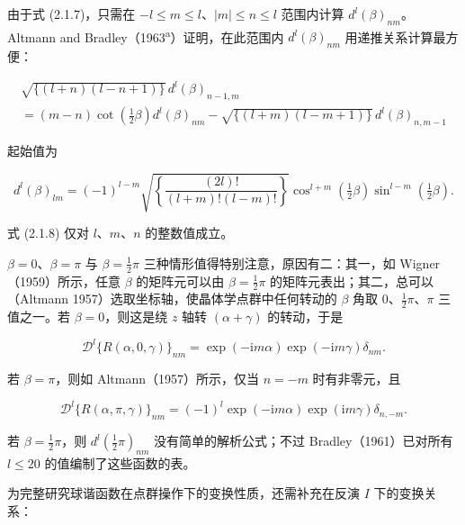 由于式 (2.1.7)，只需在 $-l \leqslant m \leqslant l$、$|m| \leqslant n \leqslant l$ 范围内计算 $d^{l}(\beta)_{nm}$。Altmann and Bradley（1963\textsuperscript{a}）证明，在此范围内 $d^{l}(\beta)_{nm}$ 用递推关系计算最方便：

\begin{equation*}
\begin{aligned}
\sqrt{\{(l+n)(l-n+1)\}}\, d^{l}(\beta)_{n-1,m} \\
= (m-n)\cot\left(\tfrac{1}{2}\beta\right)d^{l}(\beta)_{nm} - \sqrt{\{(l+m)(l-m+1)\}}\, d^{l}(\beta)_{n,m-1}
\end{aligned}
\tag{2.1.8}
\end{equation*}

起始值为

\begin{equation*}
d^{l}(\beta)_{lm} = (-1)^{l-m}\sqrt{\left\{\frac{(2l)!}{(l+m)!(l-m)!}\right\}}\cos^{l+m}\left(\tfrac{1}{2}\beta\right)\sin^{l-m}\left(\tfrac{1}{2}\beta\right).
\tag{2.1.9}
\end{equation*}

式 (2.1.8) 仅对 $l$、$m$、$n$ 的整数值成立。

$\beta = 0$、$\beta = \pi$ 与 $\beta = \tfrac{1}{2}\pi$ 三种情形值得特别注意，原因有二：其一，如 Wigner（1959）所示，任意 $\beta$ 的矩阵元可以由 $\beta = \tfrac{1}{2}\pi$ 的矩阵元表出；其二，总可以（Altmann 1957）选取坐标轴，使晶体学点群中任何转动的 $\beta$ 角取 $0$、$\tfrac{1}{2}\pi$、$\pi$ 三值之一。若 $\beta = 0$，则这是绕 $z$ 轴转 $(\alpha + \gamma)$ 的转动，于是

\begin{equation*}
\mathscr{D}^{l}\{R(\alpha, 0, \gamma)\}_{nm} = \exp(-\mathrm{i}m\alpha)\exp(-\mathrm{i}m\gamma)\delta_{nm}.
\tag{2.1.10}
\end{equation*}

若 $\beta = \pi$，则如 Altmann（1957）所示，仅当 $n = -m$ 时有非零元，且

\begin{equation*}
\mathscr{D}^{l}\{R(\alpha, \pi, \gamma)\}_{nm} = (-1)^{l}\exp(-\mathrm{i}m\alpha)\exp(\mathrm{i}m\gamma)\delta_{n,-m}.
\tag{2.1.11}
\end{equation*}

若 $\beta = \tfrac{1}{2}\pi$，则 $d^{l}(\tfrac{1}{2}\pi)_{nm}$ 没有简单的解析公式；不过 Bradley（1961）已对所有 $l \leqslant 20$ 的值编制了这些函数的表。

为完整研究球谐函数在点群操作下的变换性质，还需补充在反演 $I$ 下的变换关系：


